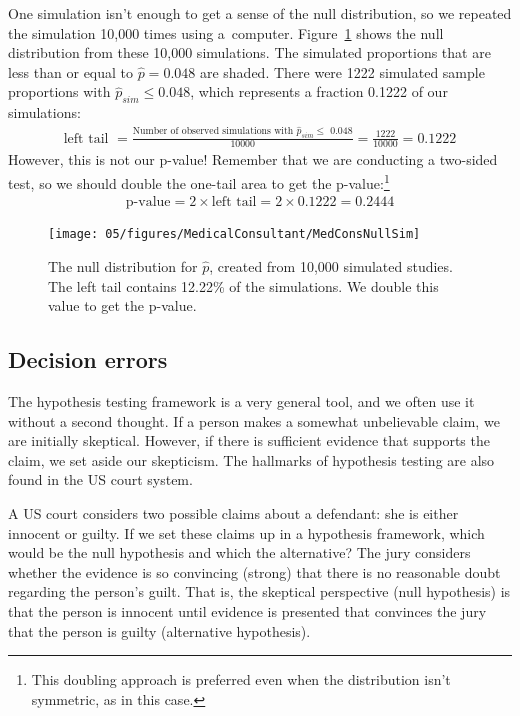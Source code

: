 One simulation isn't enough to get a sense of the null distribution, so we repeated the simulation 10,000 times using a~computer. Figure~\ref{MedConsNullSim} shows the null distribution from these 10,000 simulations. The simulated proportions that are less than or equal to $\hat{p}=0.048$ are shaded. There were 1222 simulated sample proportions with $\hat{p}_{sim} \leq 0.048$, which represents a fraction 0.1222 of our simulations:
\begin{align*}
\text{left tail }
	= \frac{\text{Number of observed simulations with }\hat{p}_{sim}\leq\text{ 0.048}}{10000}
	= \frac{1222}{10000} = 0.1222
\end{align*}
However, this is not our p-value! Remember that we are conducting a two-sided test, so we should double the one-tail area to get the p-value:\footnote{This doubling approach is preferred even when the distribution isn't symmetric, as in this case.}
\begin{align*}
\text{p-value} = 2 \times \text{left tail} = 2 \times 0.1222 = 0.2444
\end{align*}

\begin{figure}[ht]
\centering
\texttt{[image: 05/figures/MedicalConsultant/MedConsNullSim]}
\caption{The null distribution for $\hat{p}$, created from 10,000 simulated studies. The left tail contains 12.22\% of the simulations. We double this value to get the p-value.}
\label{MedConsNullSim}
\end{figure}


\subsection{Decision errors}
The hypothesis testing framework is a very general tool, and we often use it without a second thought. If a person makes a somewhat unbelievable claim, we are initially skeptical. However, if there is sufficient evidence that supports the claim, we set aside our skepticism. The hallmarks of hypothesis testing are also found in the US court system. 

\begin{example}{A US court considers two possible claims about a defendant: she is either innocent or guilty. If we set these claims up in a hypothesis framework, which would be the null hypothesis and which the alternative?}\label{hypTestCourtExample}
The jury considers whether the evidence is so convincing (strong) that there is no reasonable doubt regarding the person's guilt. That is, the skeptical perspective (null hypothesis) is that the person is innocent until evidence is presented that convinces the jury that the person is guilty (alternative hypothesis).
\end{example}

